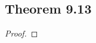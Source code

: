 \documentclass[../../main.tex]{subfiles}
\begin{document}
\subsection{Theorem 9.13}
\begin{wts}

\end{wts}
\begin{proof}

\end{proof}
\end{document}
